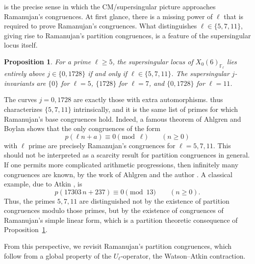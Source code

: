 \documentclass[12pt]{amsart}
\newtheorem{proposition}[theorem]{Proposition}
\theoremstyle{definition}
\theoremstyle{remark}
\newcommand{\F}{\mathbb{F}}
\begin{document}
 is the precise sense in which the CM/supersingular picture approaches
Ramanujan's congruences. At first glance, there is a missing power of $\ell$ that is required to prove Ramanujan's congruences.
What distinguishes $\ell\in\{5,7,11\}$, giving rise to Ramanujan's partition congruences, is a feature of the
supersingular locus itself.

\begin{proposition}\label{prop:bonus}
For a prime $\ell\ge5$, the supersingular locus of $X_0(6)_{\F_\ell}$ lies entirely above
$j\in\{0,1728\}$ if and only if $\ell\in\{5,7,11\}$. The supersingular $j$-invariants are
$\{0\}$ for $\ell=5$, $\{1728\}$ for $\ell=7$, and $\{0,1728\}$ for $\ell=11$.
\end{proposition}

The curves $j=0,1728$ are exactly those with extra automorphisms.  thus
characterizes $\{5,7,11\}$ intrinsically, and it is the same list of primes for which
Ramanujan's base congruences hold.  Indeed, a famous theorem of Ahlgren and Boylan \cite{AB} shows that the
only congruences of the form
\[
        p(\ell n+a)\equiv 0 \pmod{\ell}
        \qquad (n\geq 0)
\]
with $\ell$ prime are precisely Ramanujan's congruences for
$\ell=5,7,11$.  This should not be interpreted as a scarcity result for
partition congruences in general.  If one permits more complicated
arithmetic progressions, then infinitely many congruences are known, by
the work of  Ahlgren and the author \cite{AhlgrenOno, Ono}.  A
classical example, due to Atkin \cite{Atkin1968}, is
\[
        p\!\left(17303\, n+237\right)\equiv 0 \pmod{13}
        \qquad (n\geq 0).
\]
Thus, the primes $5,7,11$ are distinguished not by the existence of
partition congruences modulo those primes, but by the existence of
congruences of Ramanujan's simple linear form, which is a partition theoretic consequence of Proposition~\ref{prop:bonus}.

From this perspective, we revisit Ramanujan's partition congruences, which follow
 from a global
property of the $U_\ell$-operator, the Watson--Atkin contraction. 
\end{document}

